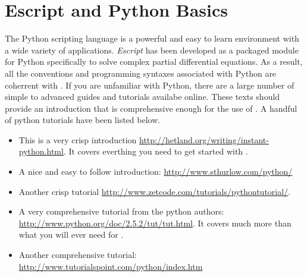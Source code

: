
%
%
%

\section{Escript and Python Basics} \label{sec:escpybas}

The Python scripting language is a powerful and easy to learn environment with a wide variety of applications. \textit{Escript} has been developed as a packaged module for Python specifically to solve complex partial differential equations. As a result, all the conventions and programming syntaxes associated with Python are coherrent with \ESCRIPT. If you are unfamiliar with Python, there are a large number of simple to advanced guides and tutorials availabe online. These texts should provide an introduction that is comprehensive enough for the use of \ESCRIPT. A handful of python tutorials have been listed below.
\begin{itemize}
\item This is a very crisp introduction \url{http://hetland.org/writing/instant-python.html}. It covers everthing you need to get started with \ESCRIPT.
\item A nice and easy to follow introduction: \url{http://www.sthurlow.com/python/}
\item Another crisp tutorial \url{http://www.zetcode.com/tutorials/pythontutorial/}. 
 \item A very comprehensive tutorial from the python authors: \url{http://www.python.org/doc/2.5.2/tut/tut.html}. It covers much more than what you will ever need for \ESCRIPT.
\item Another comprehensive tutorial: \url{http://www.tutorialspoint.com/python/index.htm}
\end{itemize} 


